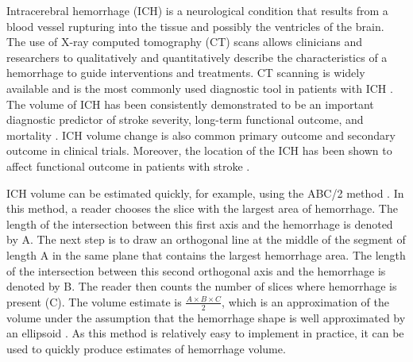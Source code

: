 \documentclass{elsarticle_nonatbib}\usepackage[]{graphicx}\usepackage[]{color}
\begin{document}
Intracerebral hemorrhage (ICH) is a neurological condition that results from a blood vessel rupturing into the tissue and possibly the ventricles of the brain.   The use of X-ray computed tomography (CT) scans allows clinicians and researchers to qualitatively and quantitatively describe the characteristics of a hemorrhage to guide interventions and treatments.  CT scanning is widely available and is the most commonly used diagnostic tool in patients with ICH \citep{sahni_management_2007}.  The volume of ICH has been consistently demonstrated to be an important diagnostic predictor of stroke severity, long-term functional outcome, and mortality \citep{broderick_volume_1993, hemphill_ich_2001, tuhrim_volume_1999}.  ICH volume change is also common primary outcome \citep{anderson_intensive_2008, anderson_effects_2010, qureshi_association_2011, mayer_recombinant_2005} and secondary outcome \citep{morgan_preliminary_2008_mistie, anderson_intensive_2008, morgan_preliminary_2008_clear} in clinical trials.  Moreover, the location of the ICH has been shown to affect functional outcome in patients with stroke \citep{rost_prediction_2008, castellanos_predictors_2005}.

ICH volume can be estimated quickly, for example,  using the ABC/2 method \citep{broderick_volume_1993}.  In this method, a reader chooses the slice with the largest area of hemorrhage.  The length of the intersection between this first axis and the hemorrhage is denoted by A. The next step is to draw an orthogonal line  at the middle of the segment of length A in the same plane that contains the largest hemorrhage area. The length of the intersection between this second orthogonal axis and the hemorrhage is denoted by B.  The reader then counts the number of slices where hemorrhage is present (C).  The volume estimate is $\frac{A\times B\times C}{2}$, which is an approximation of the volume under the assumption that the hemorrhage shape is well approximated by an ellipsoid \citep{kothari_abcs_1996}.  As this method is relatively easy to implement in practice, it can be used to quickly produce estimates of hemorrhage volume. 
\end{document}
